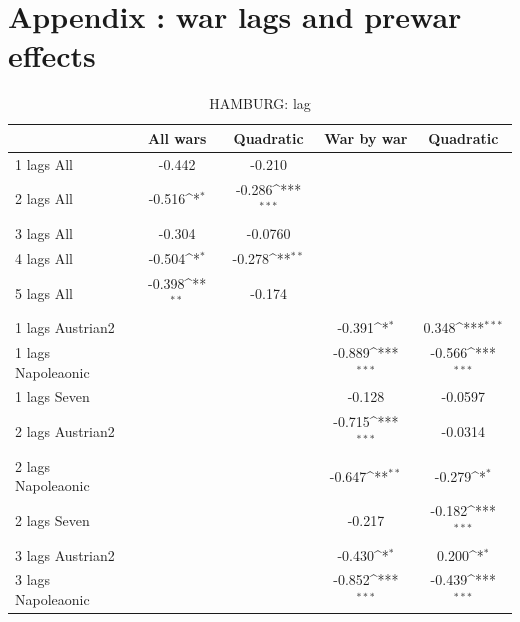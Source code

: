 \documentclass[12pt,a4paper,titlepage]{article}
\begin{document}
\newpage
\appendix
\section{Appendix : war lags and prewar effects}
\begin{table}[htbp]\centering
\def\sym#1{\ifmmode^{#1}\else\(^{#1}\)\fi}
\caption{HAMBURG: lag \label{tab1}}
\begin{tabular}{l*{4}{c}}
\hline\hline
                    &\multicolumn{1}{c}{All wars}&\multicolumn{1}{c}{Quadratic}&\multicolumn{1}{c}{War by war}&\multicolumn{1}{c}{Quadratic}\\
\hline
1 lags All          &      -0.442         &      -0.210         &                     &                     \\
2 lags All          &      -0.516\sym{*}  &      -0.286\sym{***}&                     &                     \\
3 lags All          &      -0.304         &     -0.0760         &                     &                     \\
4 lags All          &      -0.504\sym{*}  &      -0.278\sym{**} &                     &                     \\
5 lags All          &      -0.398\sym{**} &      -0.174         &                     &                     \\
1 lags Austrian2    &                     &                     &      -0.391\sym{*}  &       0.348\sym{***}\\
1 lags Napoleaonic  &                     &                     &      -0.889\sym{***}&      -0.566\sym{***}\\
1 lags Seven        &                     &                     &      -0.128         &     -0.0597         \\
2 lags Austrian2    &                     &                     &      -0.715\sym{***}&     -0.0314         \\
2 lags Napoleaonic  &                     &                     &      -0.647\sym{**} &      -0.279\sym{*}  \\
2 lags Seven        &                     &                     &      -0.217         &      -0.182\sym{***}\\
3 lags Austrian2    &                     &                     &      -0.430\sym{*}  &       0.200\sym{*}  \\
3 lags Napoleaonic  &                     &                     &      -0.852\sym{***}&      -0.439\sym{***}\\

\end{tabular}
\end{table}
\end{document}
